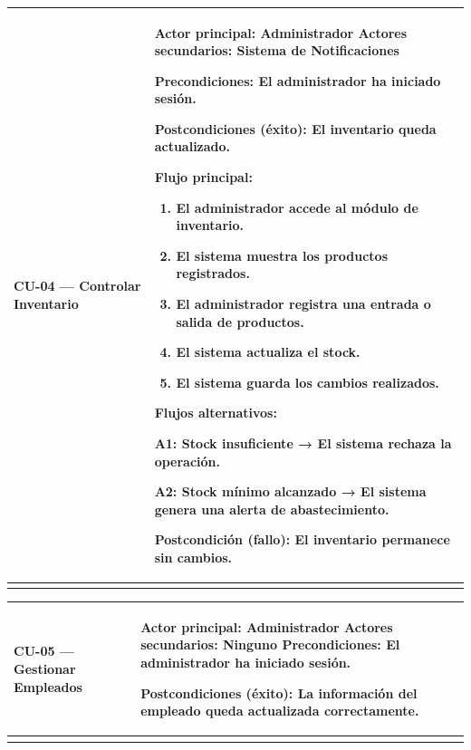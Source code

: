\documentclass[
]{article}
\newcounter{none} %
\begin{document}
{\def\LTcaptype{none} %
\begin{longtable}[]{@{}
  >{\raggedright\arraybackslash}p{}
  >{\raggedright\arraybackslash}p{}@{}}
\toprule\noalign{}
\begin{minipage}[b]{\linewidth}\raggedright
CU-04 --- Controlar Inventario
\end{minipage} & \begin{minipage}[b]{\linewidth}\raggedright
\textbf{Actor principal:} Administrador \textbf{Actores secundarios:}
Sistema de Notificaciones

\textbf{Precondiciones:} El administrador ha iniciado sesión.

\textbf{Postcondiciones (éxito):} El inventario queda actualizado.

\textbf{Flujo principal:}

\begin{enumerate}
\def\labelenumi{\arabic{enumi}.}
\item
  El administrador accede al módulo de inventario.
\item
  El sistema muestra los productos registrados.
\item
  El administrador registra una entrada o salida de productos.
\item
  El sistema actualiza el stock.
\item
  El sistema guarda los cambios realizados.
\end{enumerate}

\textbf{Flujos alternativos:}

A1: Stock insuficiente → El sistema rechaza la operación.

A2: Stock mínimo alcanzado → El sistema genera una alerta de
abastecimiento.

Postcondición (fallo): El inventario permanece sin cambios.
\end{minipage} \\
\midrule\noalign{}
\endhead
\bottomrule\noalign{}
\endlastfoot
\end{longtable}
}

{\def\LTcaptype{none} %
\begin{longtable}[]{@{}
  >{\raggedright\arraybackslash}p{}
  >{\raggedright\arraybackslash}p{}@{}}
\toprule\noalign{}
\begin{minipage}[b]{\linewidth}\raggedright
CU-05 --- Gestionar Empleados
\end{minipage} & \begin{minipage}[b]{\linewidth}\raggedright
\textbf{Actor principal:} Administrador \textbf{Actores secundarios:}
Ninguno \textbf{Precondiciones:} El administrador ha iniciado sesión.

\textbf{Postcondiciones (éxito):} La información del empleado queda
actualizada correctamente.
\end{minipage} \\
\midrule\noalign{}
\endhead
\bottomrule\noalign{}
\endlastfoot
\end{longtable}
}
\end{document}
